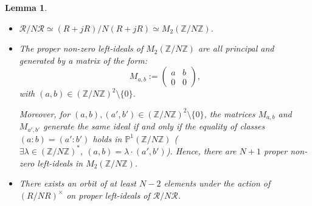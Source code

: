 \documentclass[a4paper,10pt]{report}
\theoremstyle{definition}
\theoremstyle{plain}
\newtheorem{Lemma}[Definition]{Lemma}
\theoremstyle{definition}
\newcommand{\Z}{\mathbb{Z}}
\newcommand{\m}[1]{\mathcal{#1}}
\renewcommand{\(}{\left(}
\renewcommand{\)}{\right)}
\renewcommand{\P}{\mathbb{P}}
\begin{document}
\begin{Lemma}\label{Lemma 4}
\begin{itemize}
\item[(i)] $\m{R}/N\m{R}\simeq (R+jR)/N(R+jR) \simeq M_2(\Z/N\Z)$.
\item[(ii)] The proper non-zero left-ideals of $M_2(\Z/N\Z)$ are all principal and generated by a matrix of the form:
\[M_{a,b}:=\(\begin{array}{cc}
a  & b\\ 0 & 0
\end{array}\),\]
with $(a,b)\in(\Z/N\Z)^2\setminus\{0\}$.  

Moreover, for $(a,b),(a',b')\in(\Z/N\Z)^2\setminus\{0\}$, the matrices $M_{a,b}$ and $M_{a',b'}$ generate the same ideal if and only if the equality of classes $(a:b)=(a':b')$ holds in $\P^1(\Z/N\Z)$ ($\exists \lambda\in(\Z/N\Z)^*, \ (a,b)=\lambda\cdot(a',b')$). Hence, there are $N+1$ proper non-zero left-ideals in $M_2(\Z/N\Z)$.

\item[(iii)] There exists an orbit of at least $N-2$ elements under the action of $(R/NR)^\times$ on proper left-ideals of $\m{R}/N\m{R}$.
\end{itemize}
\end{Lemma}
\end{document}
